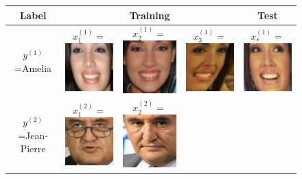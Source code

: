 \documentclass[twoside,11pt]{article}
\begin{document}
\begin{figure}
\centering
\begin{tabular}{|c|ccc|c|}
\hline
Label & & Training & & Test\\ \hline
$y^{(1)}$=Amelia & 
  $x_1^{(1)} = $\includegraphics[scale = 0.2]{face_photos/Amelia_Vega_0001.png} &  
  $x_2^{(1)} = $\includegraphics[scale = 0.2]{face_photos/Amelia_Vega_0002.png} &  
  $x_3^{(1)} = $\includegraphics[scale = 0.2]{face_photos/Amelia_Vega_0003.png} &  
  $x_*^{(1)} = $\includegraphics[scale = 0.2]{face_photos/Amelia_Vega_0004.png} \\ \hline
$y^{(2)}$=Jean-Pierre & 
  $x_1^{(2)} = $\includegraphics[scale = 0.2]{face_photos/Jean-Pierre_Raffarin_0001.png} &  
  $x_2^{(2)} = $\includegraphics[scale = 0.2]{face_photos/Jean-Pierre_Raffarin_0002.png} &  

\end{tabular}
\end{figure}
\end{document}
